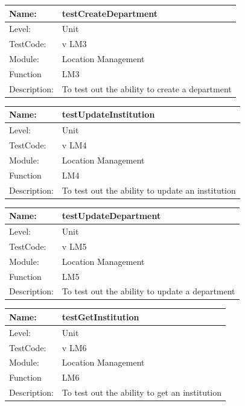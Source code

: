 \documentclass[12pt]{article}
\begin{document}
\begin{flushleft}
\begin{center}
\begin{tabular}{|l|p{12cm}|}
\hline

 Name: & testCreateDepartment\\
 \hline
Level: & Unit \\
\hline
TestCode: & v LM3 \\
\hline
Module:& Location Management \\
\hline
Function & LM3 \\
\hline
Description: & To test out the ability to create a department  \\
\hline
\end{tabular}
\end{center}

\begin{center}
\begin{tabular}{|l|p{12cm}|}
\hline

 Name: & testUpdateInstitution\\
 \hline
Level: & Unit \\
\hline
TestCode: & v LM4 \\
\hline
Module:& Location Management \\
\hline
Function & LM4 \\
\hline
Description: & To test out the ability to update an institution  \\
\hline
\end{tabular}
\end{center}

\begin{center}
\begin{tabular}{|l|p{12cm}|}
\hline

 Name: & testUpdateDepartment \\
 \hline
Level: & Unit \\
\hline
TestCode: & v LM5 \\
\hline
Module:& Location Management \\
\hline
Function & LM5 \\
\hline
Description: & To test out the ability to update a department  \\
\hline
\end{tabular}
\end{center}

\begin{center}
\begin{tabular}{|l|p{12cm}|}
\hline

 Name: & testGetInstitution \\
 \hline
Level: & Unit \\
\hline
TestCode: & v LM6 \\
\hline
Module:& Location Management \\
\hline
Function & LM6 \\
\hline
Description: & To test out the ability to get an institution  \\
\hline
\end{tabular}
\end{center}


\end{flushleft}
\end{document}
